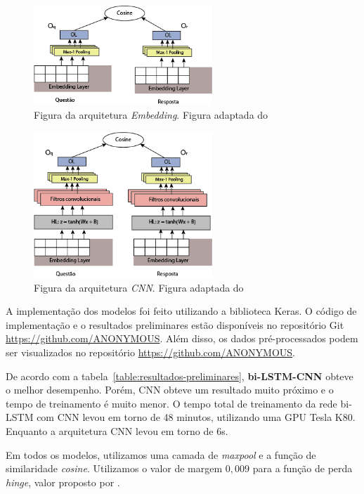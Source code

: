 \documentclass[12pt]{article}
\begin{document}
\begin{figure}[h]
    \centering
    \includegraphics[width=0.60\textwidth]{figures/ArquiteturaEmbedding.png}
    \caption{Figura da arquitetura \emph{Embedding}. Figura adaptada do \cite{tan-lstm-qa}}
    \label{fig:arquitetura-embedding}
\end{figure}

\begin{figure}[h]
    \centering
    \includegraphics[width=0.60\textwidth]{figures/ArquiteturaCNN.png}
    \caption{Figura da arquitetura \emph{CNN}. Figura adaptada do \cite{tan-lstm-qa}}
    \label{fig:arquitetura-cnn}
\end{figure}

A implementação dos modelos foi feito utilizando a biblioteca Keras. O código de implementação e o resultados preliminares estão disponíveis no repositório Git \url{https://github.com/ANONYMOUS}. Além disso, os dados pré-processados podem ser visualizados no repositório \url{https://github.com/ANONYMOUS}.

De acordo com a tabela~\ref{table:resultados-preliminares}, \textbf{bi-LSTM-CNN} obteve o melhor desempenho. Porém, CNN obteve um resultado muito próximo e o tempo de treinamento é muito menor. O tempo total de treinamento da rede bi-LSTM com CNN levou em torno de 48 minutos, utilizando uma GPU Tesla K80. Enquanto a arquitetura CNN levou em torno de 6s. 

Em todos os modelos, utilizamos uma camada de \textit{maxpool} e a função de similaridade \textit{cosine}. Utilizamos o valor de margem $0,009$ para a função de perda \textit{hinge}, valor proposto por \cite{feng-answer-selection-2015}.
\end{document}
